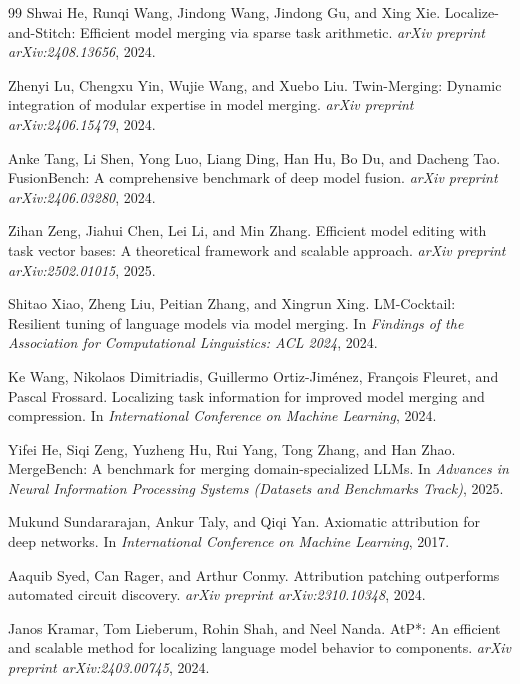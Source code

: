\documentclass[11pt]{article}
\begin{document}
\begin{thebibliography}{99}
Shwai He, Runqi Wang, Jindong Wang, Jindong Gu, and Xing Xie.
\newblock Localize-and-Stitch: Efficient model merging via sparse task arithmetic.
\newblock \emph{arXiv preprint arXiv:2408.13656}, 2024.

Zhenyi Lu, Chengxu Yin, Wujie Wang, and Xuebo Liu.
\newblock Twin-Merging: Dynamic integration of modular expertise in model merging.
\newblock \emph{arXiv preprint arXiv:2406.15479}, 2024.

Anke Tang, Li Shen, Yong Luo, Liang Ding, Han Hu, Bo Du, and Dacheng Tao.
\newblock FusionBench: A comprehensive benchmark of deep model fusion.
\newblock \emph{arXiv preprint arXiv:2406.03280}, 2024.

Zihan Zeng, Jiahui Chen, Lei Li, and Min Zhang.
\newblock Efficient model editing with task vector bases: A theoretical framework and scalable approach.
\newblock \emph{arXiv preprint arXiv:2502.01015}, 2025.

Shitao Xiao, Zheng Liu, Peitian Zhang, and Xingrun Xing.
\newblock LM-Cocktail: Resilient tuning of language models via model merging.
\newblock In \emph{Findings of the Association for Computational Linguistics: ACL 2024}, 2024.

Ke Wang, Nikolaos Dimitriadis, Guillermo Ortiz-Jim\'enez, Fran\c{c}ois Fleuret, and Pascal Frossard.
\newblock Localizing task information for improved model merging and compression.
\newblock In \emph{International Conference on Machine Learning}, 2024.

Yifei He, Siqi Zeng, Yuzheng Hu, Rui Yang, Tong Zhang, and Han Zhao.
\newblock MergeBench: A benchmark for merging domain-specialized LLMs.
\newblock In \emph{Advances in Neural Information Processing Systems (Datasets and Benchmarks Track)}, 2025.

Mukund Sundararajan, Ankur Taly, and Qiqi Yan.
\newblock Axiomatic attribution for deep networks.
\newblock In \emph{International Conference on Machine Learning}, 2017.

Aaquib Syed, Can Rager, and Arthur Conmy.
\newblock Attribution patching outperforms automated circuit discovery.
\newblock \emph{arXiv preprint arXiv:2310.10348}, 2024.

Janos Kramar, Tom Lieberum, Rohin Shah, and Neel Nanda.
\newblock AtP*: An efficient and scalable method for localizing language model behavior to components.
\newblock \emph{arXiv preprint arXiv:2403.00745}, 2024.

\end{thebibliography}
\end{document}

